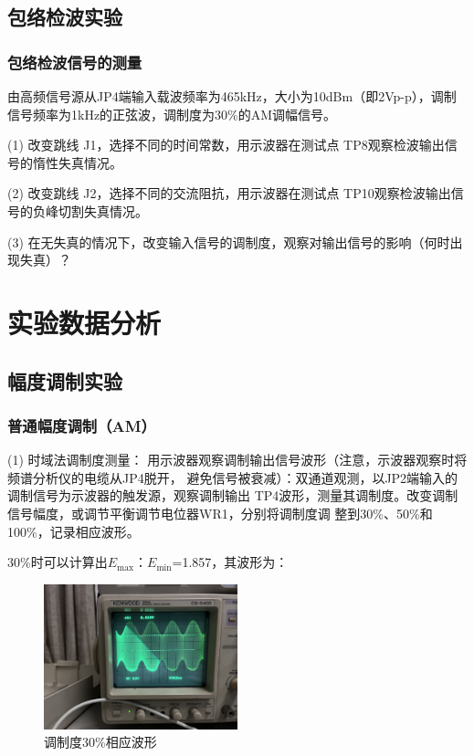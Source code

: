\documentclass{../source/Experiment}
\begin{document}
        \subsection{包络检波实验}
        
        \subsubsection{包络检波信号的测量}
        
        由高频信号源从JP4端输入载波频率为465kHz，大小为10dBm（即2Vp-p），调制信号频率为1kHz的正弦波，调制度为30\%的AM调幅信号。

        (1) 改变跳线 J1，选择不同的时间常数，用示波器在测试点 TP8观察检波输出信号的惰性失真情况。

        (2) 改变跳线 J2，选择不同的交流阻抗，用示波器在测试点 TP10观察检波输出信号的负峰切割失真情况。
        
        (3) 在无失真的情况下，改变输入信号的调制度，观察对输出信号的影响（何时出现失真）？
\section{实验数据分析}
\subsection{幅度调制实验}

\subsubsection{普通幅度调制（AM）}
(1) 时域法调制度测量：
用示波器观察调制输出信号波形（注意，示波器观察时将频谱分析仪的电缆从JP4脱开，
避免信号被衰减）：双通道观测，以JP2端输入的调制信号为示波器的触发源，观察调制输出
TP4波形，测量其调制度。改变调制信号幅度，或调节平衡调节电位器WR1，分别将调制度调
整到30\%、50\%和100\%，记录相应波形。

30\%时可以计算出$E_{\max }：E_{\min }$=1.857，其波形为：
\begin{figure}[H]
    \centering
    \includegraphics[width = 0.5\textwidth]{lab6/6.png}
    \caption{调制度30\%相应波形}
\end{figure}
\end{document}

